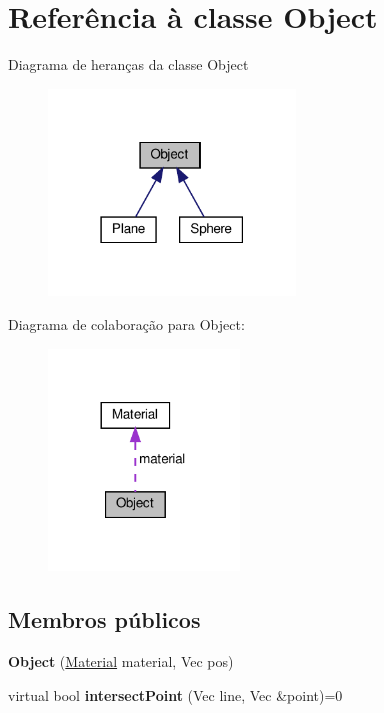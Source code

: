 \hypertarget{classObject}{}\section{Referência à classe Object}
\label{classObject}


Diagrama de heranças da classe Object\nopagebreak
\begin{figure}[H]
\begin{center}
\leavevmode
\includegraphics[width=186pt]{classObject__inherit__graph}
\end{center}
\end{figure}


Diagrama de colaboração para Object\+:\nopagebreak
\begin{figure}[H]
\begin{center}
\leavevmode
\includegraphics[width=144pt]{classObject__coll__graph}
\end{center}
\end{figure}
\subsection*{Membros públicos}
\begin{DoxyCompactItemize}
\item 
\mbox{\label{classObject_add13c54b5bd59c48f75644753731ff12}} 
{\bfseries Object} (\hyperlink{classMaterial}{Material} material, Vec pos)
\item 
\mbox{\label{classObject_acd4358b792be07499816e6849e52bbe2}} 
virtual bool {\bfseries intersect\+Point} (Vec line, Vec \&point)=0
\end{DoxyCompactItemize}
